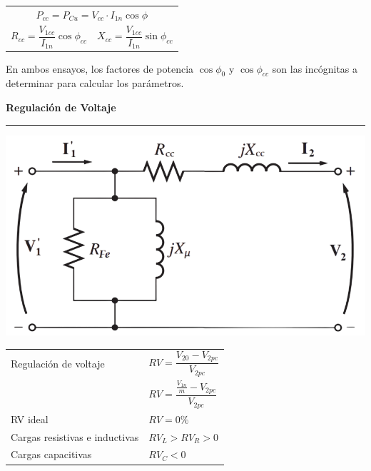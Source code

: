 \documentclass[11pt,a4paper]{article}
\newcommand{\fasor}[1]{\uppercase{\textbf{#1}}}
\newcommand{\subtitulo}[1]{
	\textbf{#1} \\ \vspace{.1cm} {\color{gray} \hrule}
}
\begin{document}
\begin{cajita}
\begin{multicols}{2}
				
			\begin{tabular}{c c}
				\multicolumn{2}{c}{$P_{cc} = P_{Cu} =V_{cc}\cdot I_{1n} \cos\phi$}\\[0.1cm]
				$ R_{cc}=\dfrac{V_{1cc}}{I_{1n}} \cos\phi_{cc} $ &$X_{cc}=\dfrac{V_{1cc}}{I_{1n}} \sin\phi_{cc}$\\[0.4cm]
				
			\end{tabular}
			
	\end{multicols}
	En ambos ensayos, los factores de potencia $\cos \phi_{0}$ y $\cos \phi_{cc}$ son las incógnitas a determinar para calcular los parámetros.
	
		\newpage
		
		\subtitulo{Regulación de Voltaje}
		\vspace{.3cm}
		
		\begin{multicols}{2}
			\includegraphics[width=\linewidth]{circuito-rv} \\
			
			\begin{tabular}{l l}
				Regulación de voltaje & $RV=\dfrac{V_{20}-V_{2pc}}{V_{2pc}}$\\[.3cm]
				& $RV = \dfrac{\frac{V_{1n}}{m} - V_{2pc}}{V_{2pc}}$\\[.3cm]
				RV ideal & $RV = 0 \%$ \\[.1cm]
				Cargas resistivas e inductivas & $RV_L > RV_R > 0$ \\[.1cm]
				Cargas capacitivas & $RV_C < 0$ \\
			\end{tabular}\\
		\end{multicols}
		

\end{cajita}
\end{document}
